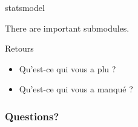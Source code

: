 \begin{frame}{statsmodel}

  \centerline{There are important submodules.}
\end{frame}

\begin{frame}{Retours}
  \begin{itemize}
  \item Qu'est-ce qui vous a plu ?
  \item Qu'est-ce qui vous a manqué ?
  \end{itemize}
\end{frame}



\begin{frame}
  \frametitle{Questions?}
\end{frame}


